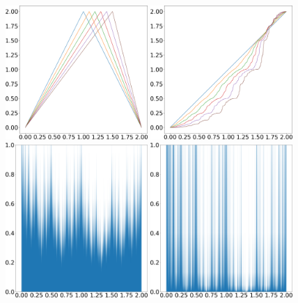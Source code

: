 \begin{figure}[H]
    \centering
    \includegraphics[width=0.48\textwidth]{figure/tilted_tent_map.png}
    \hspace{0.02\textwidth}
    \includegraphics[width=0.48\textwidth]{figure/tilted_conjugate_map.png}
    \\ \vspace{0.02\textwidth}
    \includegraphics[width=0.48\textwidth]{figure/tilted_conjugate_density_0.1.png}
    \hspace{0.02\textwidth}
    \includegraphics[width=0.48\textwidth]{figure/tilted_conjugate_density_0.5.png}

\end{figure}
